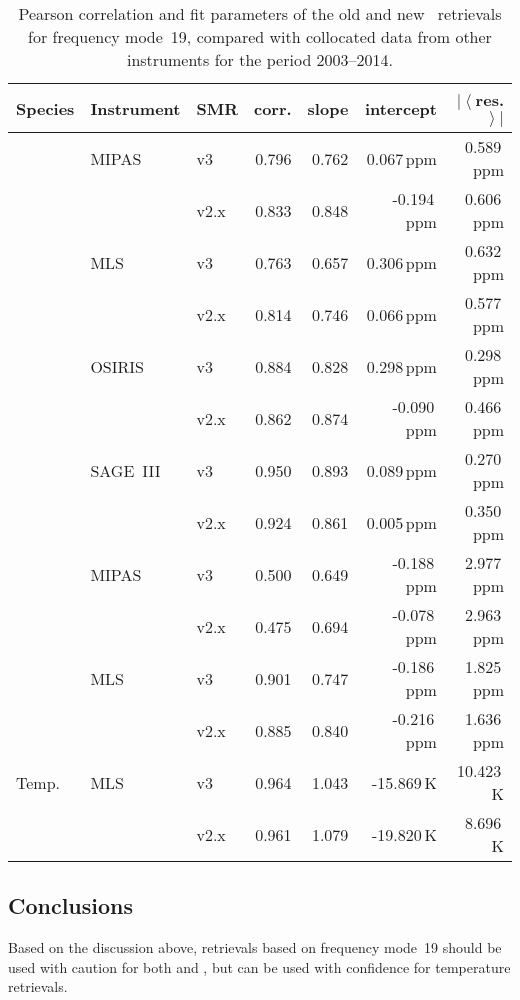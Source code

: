 \begin{table}[tbhp]
\centering
\caption{Pearson correlation and fit parameters of the old and new \smr\
retrievals for frequency mode~19, compared with collocated data from other
instruments for the period 2003--2014.
}
\label{tab:fm19:stats}
\begin{tabular}{lllrrrr}
    \toprule
    \textbf{Species} & \textbf{Instrument} & \textbf{SMR} & \textbf{corr.} & \textbf{slope} & \textbf{intercept} & \textbf{$\left|\left<\right.\right.$res.$\left.\left.\right>\right|$} \\
    \midrule
    \chem{O3}   & MIPAS     & v3    & 0.796 & 0.762 & 0.067\,ppm    & 0.589\,ppm \\
                &           & v2.x  & 0.833 & 0.848 & -0.194\,ppm   & 0.606\,ppm \\
    \cline{2-7}
                & MLS       & v3    & 0.763 & 0.657 & 0.306\,ppm    & 0.632\,ppm \\
                &           & v2.x  & 0.814 & 0.746 & 0.066\,ppm    & 0.577\,ppm \\
    \cline{2-7}
                & OSIRIS    & v3    & 0.884 & 0.828 & 0.298\,ppm    & 0.298\,ppm \\
                &           & v2.x  & 0.862 & 0.874 & -0.090\,ppm   & 0.466\,ppm \\
    \cline{2-7}
                & SAGE~III  & v3    & 0.950 & 0.893 & 0.089\,ppm    & 0.270\,ppm \\
                &           & v2.x  & 0.924 & 0.861 & 0.005\,ppm    & 0.350\,ppm \\
    \midrule
    \chem{H_2O} & MIPAS     & v3    & 0.500 & 0.649 & -0.188\,ppm   & 2.977\,ppm \\
                &           & v2.x  & 0.475 & 0.694 & -0.078\,ppm   & 2.963\,ppm \\
    \cline{2-7}
                & MLS       & v3    & 0.901 & 0.747 & -0.186\,ppm   & 1.825\,ppm \\
                &           & v2.x  & 0.885 & 0.840 & -0.216\,ppm   & 1.636\,ppm \\
    \midrule
    Temp.       & MLS       & v3    & 0.964 & 1.043 & -15.869\,K    & 10.423\,K \\
                &           & v2.x  & 0.961 & 1.079 & -19.820\,K    &  8.696\,K \\
    \bottomrule
\end{tabular}
\end{table}

\subsection{Conclusions}
\label{sec:fm19:conclusions}

Based on the discussion above, retrievals based on frequency mode~19 should be
used with caution for both \chem{O_3} and \chem{H_2O}, but can be used with
confidence for temperature retrievals.

